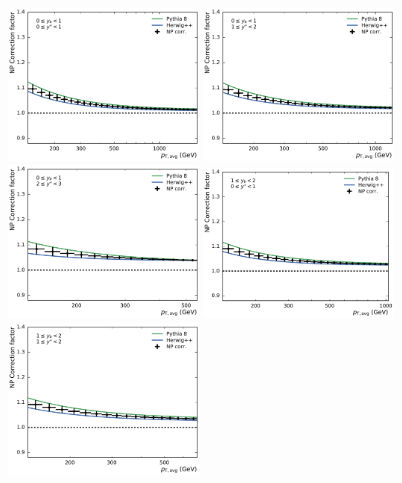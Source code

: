 \begin{figure}[htp]
    \centering
    \includegraphics[width=0.45\textwidth]{figures/theory/np_factors_calc_yb0ys0.pdf}\hfill
    \includegraphics[width=0.45\textwidth]{figures/theory/np_factors_calc_yb0ys1.pdf}
    \includegraphics[width=0.45\textwidth]{figures/theory/np_factors_calc_yb0ys2.pdf}\hfill
    \includegraphics[width=0.45\textwidth]{figures/theory/np_factors_calc_yb1ys0.pdf}
    \includegraphics[width=0.45\textwidth]{figures/theory/np_factors_calc_yb1ys1.pdf}\hfill

\end{figure}
